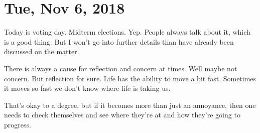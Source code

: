 \section{Tue, Nov 6, 2018}

Today is voting day. Midterm elections. Yep. People always talk about it, which is a
good thing. But I won't go into further details than have already been discussed on
the matter.

There is always a cause for reflection and concern at times. Well maybe not concern.
But reflection for sure. Life has the ability to move a bit fast. Sometimes it moves
so fast we don't know where life is taking us.

That's okay to a degree, but if it becomes more than just an annoyance, then one
needs to check themselves and see where they're at and how they're going to progress.